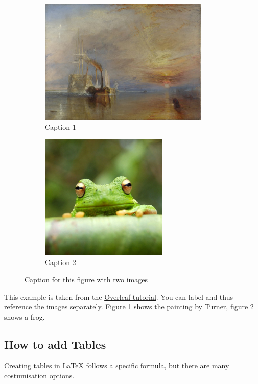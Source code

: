 \documentclass{article}
\begin{document}
\begin{figure}[H]
\begin{subfigure}{0.5\textwidth}
\includegraphics[width=0.9\linewidth, height=6cm]{temeraire.jpg} 
\caption{Caption 1}
\label{fig:subim1}
\end{subfigure}
\begin{subfigure}{0.5\textwidth}
\includegraphics[width=0.9\linewidth, height=6cm]{frog.jpg}
\caption{Caption 2}
\label{fig:subim2}
\end{subfigure}
\caption{Caption for this figure with two images}
\label{fig:image2}
\end{figure}

This example is taken from the \href{https://www.overleaf.com/learn/latex/Positioning_images_and_tables\#Multiple_images_in_one_figure}{Overleaf tutorial}. You can label and thus reference the images separately. Figure \ref{fig:subim1} shows the painting by Turner, figure \ref{fig:subim2} shows a frog.

\subsection{How to add Tables}

Creating tables in LaTeX follows a specific formula, but there are many costumisation options.
\end{document}
